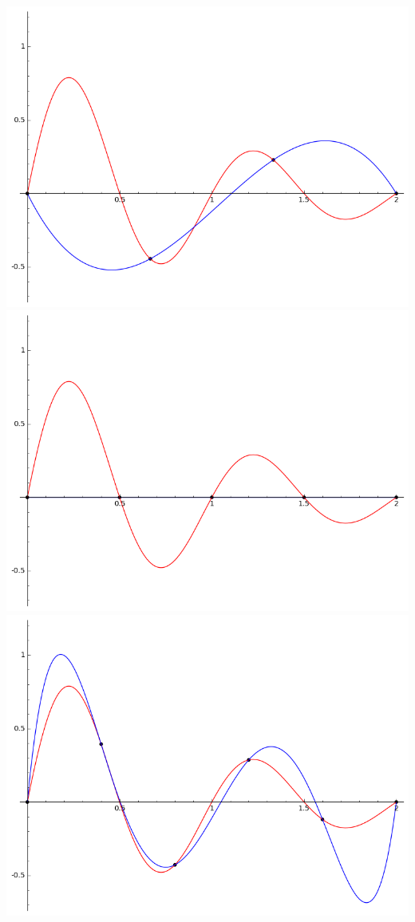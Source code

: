 \documentclass[class=report,crop=false]{standalone}
\begin{document}
\begin{enumerate}
  \begin{center}
    \includegraphics[scale=0.2]{figures/lagrange1}\quad
    \includegraphics[scale=0.2]{figures/lagrange2}\quad
    \includegraphics[scale=0.2]{figures/lagrange3}

\end{center}
\end{enumerate}
\end{document}
